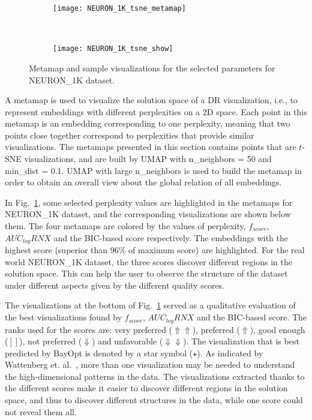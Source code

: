 \begin{figure}%
    \centering
    \begin{subfigure}[b]{\linewidth}
        \texttt{[image: NEURON\_1K\_tsne\_metamap]}
    \end{subfigure}
    ~
    \begin{subfigure}[b]{\linewidth}
        \texttt{[image: NEURON\_1K\_tsne\_show]}
    \end{subfigure}
    \caption{Metamap and sample visualizations for the selected parameters for {NEURON\_1K} dataset.}
    \label{fig:tsne:meta:NEURON1K}
\end{figure}

A metamap is used to visualize the solution space of a DR visualization, i.e., to represent embeddings with different perplexities on a 2D space.
Each point in this metamap is an embedding corresponding to one perplexity, meaning that two points close together correspond to perplexities that provide similar visualizations.
The metamaps presented in this section contains points that are $t$-SNE visualizations, and are built by UMAP with {n\_neighbors} = 50 and {min\_dist} = 0.1.
UMAP with large {n\_neighbors} is used to build the metamap in order to obtain an overall view about the global relation of all embeddings.

In Fig.~\ref{fig:tsne:meta:NEURON1K}, some selected perplexity values are highlighted in the metamaps for {NEURON\_1K} dataset, and the corresponding visualizations are shown below them.
The four metamaps are colored by the values of perplexity, $f_{score}$, $AUC_{log}RNX$ and the BIC-based score respectively.
The embeddings with the highest score (superior than 96\% of maximum score) are highlighted.
For the real world {NEURON\_1K} dataset, the three scores discover different regions in the solution space. This can help the user to observe the structure of the dataset under different aspects given by the different quality scores.

The visualizations at the bottom of Fig.~\ref{fig:tsne:meta:NEURON1K} served as a qualitative evaluation of the best visualizations found by $f_{score}$, $AUC_{log}RNX$ and the BIC-based score.
The ranks used for the scores are: very preferred ($\Uparrow\Uparrow$), preferred ($\Uparrow$), good enough ($[]$), not preferred ($\Downarrow$) and unfavorable ($\Downarrow\Downarrow$).
The visualization that is best predicted by BayOpt is denoted by a star symbol ($\star$).
As indicated by Wattenberg et. al.~\cite{wattenberg2016use}, more than one visualization may be needed to understand the high-dimensional patterns in the data.
The visualizations extracted thanks to the different scores make it easier to discover different regions in the solution space, and thus to discover different structures in the data, while one score could not reveal them all.

